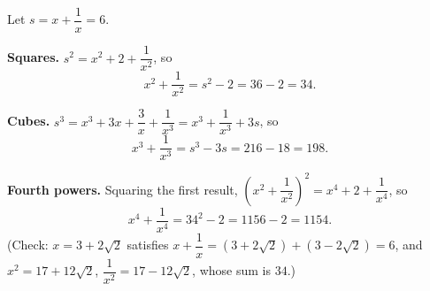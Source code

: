 Let $s=x+\dfrac{1}{x}=6$.

\textbf{Squares.} $s^2=x^2+2+\dfrac{1}{x^2}$, so
\[x^2+\dfrac{1}{x^2}=s^2-2=36-2=\boxed{34}.\]

\textbf{Cubes.} $s^3=x^3+3x+\dfrac{3}{x}+\dfrac{1}{x^3}=x^3+\dfrac{1}{x^3}+3s$, so
\[x^3+\dfrac{1}{x^3}=s^3-3s=216-18=\boxed{198}.\]

\textbf{Fourth powers.} Squaring the first result, $\left(x^2+\dfrac{1}{x^2}\right)^2=x^4+2+\dfrac{1}{x^4}$, so
\[x^4+\dfrac{1}{x^4}=34^2-2=1156-2=\boxed{1154}.\]
(Check: $x=3+2\sqrt2$ satisfies $x+\dfrac{1}{x}=(3+2\sqrt2)+(3-2\sqrt2)=6$, and $x^2=17+12\sqrt2$, $\dfrac{1}{x^2}=17-12\sqrt2$, whose sum is $34$.)
